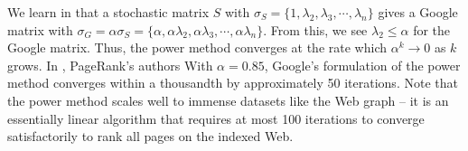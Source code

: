 \documentclass[../exploring-pagerank.tex]{subfiles}
\begin{document}
    We learn in \cite{haveliwalaSecondEigenvalueGoogle} that a stochastic matrix $S$ with $\sigma_S = \{ 1, \lambda_2, \lambda_3, \cdots, \lambda_n \}$ gives a Google matrix with $\sigma_G = \alpha\sigma_S = \{ \alpha, \alpha\lambda_2, \alpha\lambda_3, \cdots, \alpha\lambda_n \}$. From this, we see $\lambda_2 \leq \alpha$ for the Google matrix. Thus, the power method converges at the rate which $\alpha^k \to 0$ as $k$ grows. In \cite{brinPageRankCitationRanking1998}, PageRank's authors With $\alpha = 0.85$, Google's formulation of the power method converges within a thousandth by approximately 50 iterations. Note that the power method scales well to immense datasets like the Web graph -- it is an essentially linear algorithm that requires at most 100 iterations to converge satisfactorily to rank all pages on the indexed Web.
\end{document}
